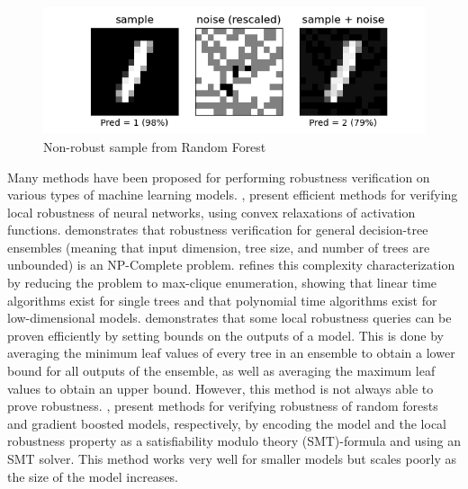 \documentclass[pageno]{jpaper}
\begin{document}
\begin{doublespacing}
\begin{figure}[h]
\centering
\includegraphics{noisy_1}
\caption{Non-robust sample from Random Forest}
\label{fig:noisy1}
\end{figure}

Many methods have been proposed for performing robustness verification on various types of machine learning models. \cite{katz}, \cite{wu} present efficient methods for verifying local robustness of neural networks, using convex relaxations of activation functions. \cite{kantchelian} demonstrates that robustness verification for general decision-tree ensembles (meaning that input dimension, tree size, and number of trees are unbounded) is an NP-Complete problem. \cite{chen} refines this complexity characterization by reducing the problem to max-clique enumeration, showing that linear time algorithms exist for single trees and that polynomial time algorithms exist for low-dimensional models. \cite{tornbloom} demonstrates that some local robustness queries can be proven efficiently by setting bounds on the outputs of a model. This is done by averaging the minimum leaf values of every tree in an ensemble to obtain a lower bound for all outputs of the ensemble, as well as averaging the maximum leaf values to obtain an upper bound. However, this method is not always able to prove robustness. \cite{einziger}, \cite{nie} present methods for verifying robustness of random forests and gradient boosted models, respectively, by encoding the model and the local robustness property as a satisfiability modulo theory (SMT)-formula and using an SMT solver. This method works very well for smaller models but scales poorly as the size of the model increases.


\end{doublespacing}
\end{document}
